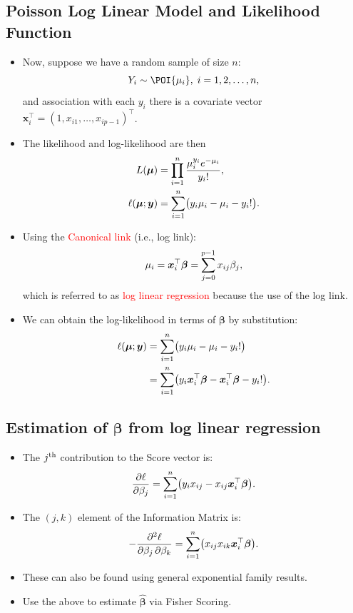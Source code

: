 \documentclass{article}\usepackage[]{graphicx}\usepackage[svgnames]{xcolor}
\let\exp\relax%
\let\log\relax%
\providecommand{\Vector}[1]{\bm{#1}}%
\begin{document}
\subsection*{Poisson Log Linear Model and Likelihood Function}
\begin{itemize}
      \item Now, suppose we have a random sample of size $ n $:
            \[ Y_i \sim \POI{\mu_i},\; i=1,2,\ldots,n, \]
            and association with each $ y_i $ there is a covariate vector $ \Vector{x}_i^\top=(1,x_{i1},\ldots,x_{ip-1})^\top $.
      \item The likelihood and log-likelihood are then
            \begin{align*}
                  L(\Vector{\mu})               & =\prod_{i=1}^n \frac{\mu_i^{y_i}e^{-\mu_i}}{y_i!},           \\
                  \ell(\Vector{\mu};\Vector{y}) & =\sum_{i=1}^{n} \bigl(y_i\log{\mu_i}-\mu_i-\log{y_i!}\bigr).
            \end{align*}
      \item Using the \textcolor{Red}{Canonical link} (i.e., log link):
            \[ \log{\mu_i}=\Vector{x}_i^\top \Vector{\beta}=\sum_{j=0}^{p-1} x_{ij}\beta_j, \]
            which is referred to as \textcolor{Red}{log linear regression} because the use of the log link.
      \item We can obtain the log-likelihood in terms of $ \Vector{\beta} $ by substitution:
            \begin{align*}
                  \ell(\Vector{\mu};\Vector{y})
                   & =\sum_{i=1}^{n} \bigl(y_i\log{\mu_i}-\mu_i-\log{y_i!}\bigr)                                                         \\
                   & =\sum_{i=1}^{n} \bigl(y_i \Vector{x}_i^\top \Vector{\beta}-\exp{\Vector{x}_i^\top \Vector{\beta}}-\log{y_i!}\bigr).
            \end{align*}
\end{itemize}
\subsection*{Estimation of $ \Vector{\beta} $ from log linear regression}
\begin{itemize}
      \item The $ j\textsuperscript{th} $ contribution to the Score vector is:
            \[ \pdv{\ell}{\beta_j}=\sum_{i=1}^{n} \bigl(y_i x_{ij}-x_{ij}\exp{\Vector{x}_i^\top \Vector{\beta}}\bigr). \]
      \item The $ (j,k) $ element of the Information Matrix is:
            \[ -\pdv{\ell}{\beta_j,\beta_k}=\sum_{i=1}^{n} \bigl(x_{ij}x_{ik}\exp{\Vector{x}_i^\top \Vector{\beta}}\bigr). \]
      \item These can also be found using general exponential family results.
      \item Use the above to estimate $ \hat{\Vector{\beta}} $ via Fisher Scoring.
\end{itemize}
\end{document}
